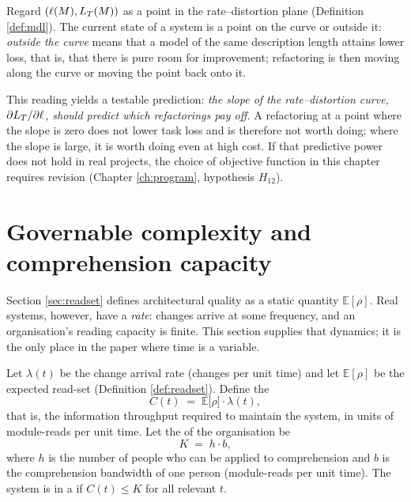 \begin{remark}\label{rmk:rd-refactor}
Regard $(\ell(M), L_T(M))$ as a point in the rate--distortion plane \cite{shannon1959}
(Definition \ref{def:mdl}). The current state of a system is a point on the curve or outside
it: \emph{outside the curve} means that a model of the same description length attains lower
loss, that is, that there is pure room for improvement; refactoring is then moving along the
curve or moving the point back onto it.

This reading yields a testable prediction: \emph{the slope of the rate--distortion curve,
$\partial L_T / \partial \ell$, should predict which refactorings pay off.} A refactoring at
a point where the slope is zero does not lower task loss and is therefore not worth doing;
where the slope is large, it is worth doing even at high cost. If that predictive power does
not hold in real projects, the choice of objective function in this chapter requires
revision (Chapter \ref{ch:program}, hypothesis $H_{12}$).
\end{remark}

\section{Governable complexity and comprehension capacity}\label{sec:governable}

Section \ref{sec:readset} defines architectural quality as a static quantity
$\mathbb{E}[\rho]$. Real systems, however, have a \emph{rate}: changes arrive at some
frequency, and an organisation's reading capacity is finite. This section supplies that
dynamics; it is the only place in the paper where time is a variable.

\begin{definition}\label{def:governable}
Let $\lambda(t)$ be the change arrival rate (changes per unit time) and let
$\mathbb{E}[\rho]$ be the expected read-set (Definition \ref{def:readset}). Define the
\begin{equation}\label{eq:governable}
C(t) \;=\; \mathbb{E}\bigl[\rho\bigr] \cdot \lambda(t),
\end{equation}
that is, the information throughput required to maintain the system, in units of
module-reads per unit time. Let the  of the organisation be
\begin{equation}\label{eq:capacity}
K \;=\; h \cdot b,
\end{equation}
where $h$ is the number of people who can be applied to comprehension and $b$ is the
comprehension bandwidth of one person (module-reads per unit time). The system is in a
 if $C(t) \le K$ for all relevant $t$.
\end{definition}

